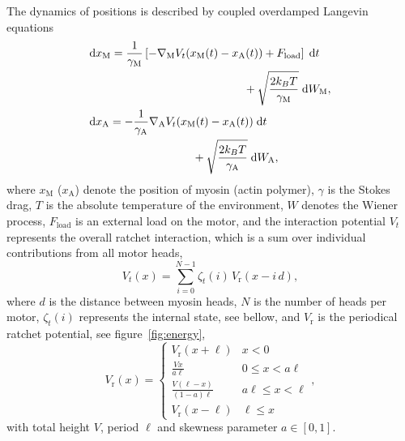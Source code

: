 \documentclass[aps,pre,twocolumn,showpacs,showkeys,superscriptaddress,floatfix]{revtex4-1}
\newcommand{\rmd}{{\mathrm d}}
\begin{document}
The dynamics of positions is described by coupled overdamped Langevin equations 
\begin{align}
&\begin{multlined}[b]
\rmd x_\text{M} = 
\frac{1}{\gamma_\text{M}} \left[ - \nabla_\text{M} V_t(x_\text{M}(t) - x_\text{A}(t)) + F_\text{load} \right] \; \rmd t 
\\ 
+ \sqrt{ \frac{2 k_B T}{\gamma_\text{M}} } \; \rmd W_\text{M} ,
\end{multlined}
\label{eq:eom_M} \\
&\begin{multlined}[b][.42\textwidth]
\rmd x_\text{A} = 
- \frac{1}{\gamma_\text{A}} \nabla_\text{A} V_t(x_\text{M}(t) - x_\text{A}(t)) \; \rmd t 
\\
+ \sqrt{ \frac{2 k_B T}{\gamma_\text{A}} } \; \rmd W_\text{A} ,
\end{multlined}
\label{eq:eom_A}
\end{align}
where $x_\text{M}$ ($x_\text{A}$) denote the position of myosin (actin polymer), 
$\gamma$ is the Stokes drag,
$T$ is the absolute temperature of the environment,
$W$ denotes the Wiener process,
$F_\text{load}$ is an external load on the motor, 
and the interaction potential $V_t$ represents the overall ratchet interaction, which is a sum over individual contributions from all motor heads,
\begin{equation}
V_t(x) = \sum\limits_{i=0}^{N-1} \zeta_t(i) \, V_\text{r} (x - i \, d ), 
\label{eq:ratchet_interaction}
\end{equation}
where $d$ is the distance between myosin heads, 
$N$ is the number of heads per motor,
$\zeta_t(i)$ represents the internal state, see bellow, 
and $V_\text{r}$ is the periodical ratchet potential, see figure~\ref{fig:energy},
\begin{equation}
V_\text{r}(x) =  \begin{cases}
        V_\text{r}(x+\ell) & x < 0 \\[1ex] 
        \displaystyle \frac{ V x }{ a \ell } & 0 \leq x < a \ell \\[2ex]
        \displaystyle \frac{ V (\ell-x) }{ (1-a) \ell } & a \ell \leq x < \ell \\[2ex]
        V_\text{r}(x-\ell) & \ell \leq x  
   \end{cases} ,
   \label{eq:ratchet_potential}
\end{equation}
with total height $V$,
period $\ell$ 
and skewness parameter $a \in [0,1]$. 
\end{document}
